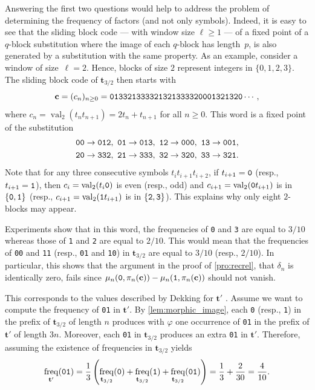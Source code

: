 \documentclass[12pt,reqno]{article}
\DeclareMathOperator{\val}{val}
\DeclareMathOperator{\freq}{freq}
\begin{document}
  Answering the first two questions would help to address the problem of determining the frequency of factors (and not only symbols). Indeed, it is easy to see that the sliding block code --- with window size $\ell\ge 1$ --- of a fixed point of a $q$-block substitution where the image of each $q$-block has length~$p$, is also generated by a substitution with the same property. As an example, consider a window of size~$\ell=2$. Hence,  blocks of size $2$ represent integers in $\{0,1,2,3\}$.  The sliding block code of $\mathbf{t}_{3/2}$ then starts with
  \[
    \mathbf{c}=(c_n)_{n\ge 0}={\tt 013321333321321333320001321320}\cdots,
  \]
 where $c_n=\val_2(t_nt_{n+1})=2t_n+t_{n+1}$ for all $n\ge 0$. 
    This word is a fixed point of the substitution
    \begin{align*}
      &{\tt 00}\to {\tt 012},\ 
      {\tt 01}\to {\tt 013},\ 
      {\tt 12}\to {\tt 000},\ 
      {\tt 13}\to {\tt 001},\\
      &{\tt 20}\to {\tt 332},\ 
      {\tt 21}\to {\tt 333},\ 
      {\tt 32}\to {\tt 320},\ 
      {\tt 33}\to {\tt 321}.
    \end{align*}
Note that for any three consecutive symbols $t_it_{i+1}t_{i+2}$, if $t_{i+1}={\tt 0}$ (resp.,   $t_{i+1}={\tt 1}$), then $c_i=\val_2(t_i{\tt 0})$ is even (resp.,  odd) and $c_{i+1}=\val_2({\tt 0}t_{i+1})$ is in $\{{\tt 0},{\tt 1}\}$ (resp.,  $c_{i+1}=\val_2({\tt 1}t_{i+1})$ is in $\{{\tt 2},{\tt 3}\}$). This explains why only eight $2$-blocks may appear.
    
    Experiments show that in this word, the frequencies of {\tt 0} and {\tt 3} are equal to $3/10$ whereas those of {\tt 1} and {\tt 2} are equal to $2/10$. This would mean that the frequencies of {\tt 00} and {\tt 11} (resp.,  {\tt 01} and {\tt 10}) in $\mathbf{t}_{3/2}$ are equal to $3/10$ (resp.,  $2/10$). In particular, this shows that the argument in the proof of \cref{pro:recrel}, that $\delta_n$ is identically zero,  fails since $\mu_n({\tt 0},\pi_n(\mathbf{c}))-\mu_n({\tt 1},\pi_n(\mathbf{c}))$ should not vanish.

    This corresponds to the values described by Dekking for $\mathbf{t}'$ \cite{DekTM}. Assume we want to compute the frequency of {\tt 01} in $\mathbf{t}'$. By \cref{lem:morphic_image}, each {\tt 0} (resp.,  {\tt 1}) in the prefix of $\mathbf{t}_{3/2}$ of length $n$ produces with $\varphi$ one occurrence of {\tt 01} in the prefix of $\mathbf{t}'$ of length $3n$. Moreover, each {\tt 01} in $\mathbf{t}_{3/2}$ produces an extra {\tt 01} in $\mathbf{t}'$. Therefore, assuming the existence of frequencies in $\mathbf{t}_{3/2}$ yields
    \[
      \freq_{\mathbf{t'}}({\tt 01})=\frac13 \left(\freq_{\mathbf{t}_{3/2}}({\tt 0})+\freq_{\mathbf{t}_{3/2}}({\tt 1})+\freq_{\mathbf{t}_{3/2}}({\tt 01})\right)=\frac13+\frac{2}{30}=\frac{4}{10}.
    \]
    
\end{document}
